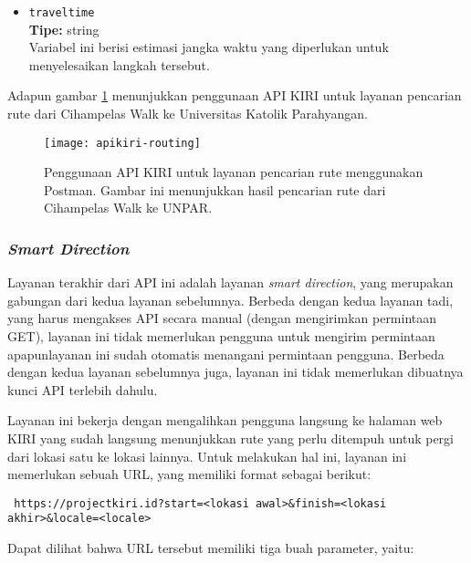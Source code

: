 \begin{itemize}
\begin{itemize}
		\item \verb|traveltime|\\
		\textbf{Tipe:} string\\
		Variabel ini berisi estimasi jangka waktu yang diperlukan untuk menyelesaikan langkah tersebut.
	\end{itemize}
	
\end{itemize}
\vspace{\baselineskip}\noindent
Adapun gambar \ref{fig:kiri-api-routing-usage} menunjukkan penggunaan API KIRI untuk layanan pencarian rute dari Cihampelas Walk ke Universitas Katolik Parahyangan.

\begin{figure}[t]
    \centering
    \texttt{[image: apikiri-routing]}
    \caption[Penggunaan API KIRI untuk layanan pencarian rute]{Penggunaan API KIRI untuk layanan pencarian rute menggunakan Postman. Gambar ini menunjukkan hasil pencarian rute dari Cihampelas Walk ke UNPAR.}
    \label{fig:kiri-api-routing-usage}
\end{figure}

\subsubsection{\textit{Smart Direction}}
\label{sec:kiri-api-smartdir}

Layanan terakhir dari API ini adalah layanan \textit{smart direction}, yang merupakan gabungan dari kedua layanan sebelumnya. Berbeda dengan kedua layanan tadi, yang harus mengakses API secara manual (dengan mengirimkan permintaan GET), layanan ini tidak memerlukan pengguna untuk mengirim permintaan apapun\textemdash layanan ini sudah otomatis menangani permintaan pengguna. Berbeda dengan kedua layanan sebelumnya juga, layanan ini tidak memerlukan dibuatnya kunci API terlebih dahulu.

Layanan ini bekerja dengan mengalihkan pengguna langsung ke halaman web KIRI yang sudah langsung menunjukkan rute yang perlu ditempuh untuk pergi dari lokasi satu ke lokasi lainnya. Untuk melakukan hal ini, layanan ini memerlukan sebuah URL, yang memiliki format sebagai berikut:

\begin{verbatim}
 https://projectkiri.id?start=<lokasi awal>&finish=<lokasi akhir>&locale=<locale>
\end{verbatim}
\noindent
Dapat dilihat bahwa URL tersebut memiliki tiga buah parameter, yaitu:


